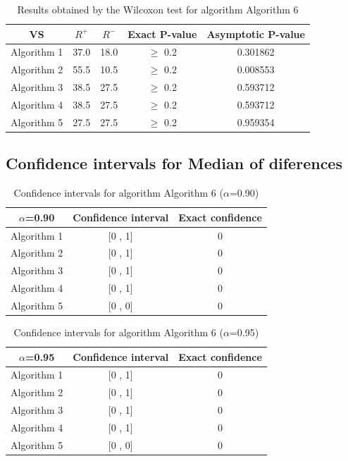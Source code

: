 \documentclass[a4paper,10pt]{article}
\begin{document}
\begin{table}[!htp]
\centering\small
\begin{tabular}{
|c|c|c|c|c|}
\hline
 VS & $R^{+}$ & $R^{-}$ & Exact P-value & Asymptotic P-value \\ \hline 
Algorithm 1 & 37.0 & 18.0 & $\geq$ 0.2 & 0.301862\\ \hline 
Algorithm 2 & 55.5 & 10.5 & $\geq$ 0.2 & 0.008553\\ \hline 
Algorithm 3 & 38.5 & 27.5 & $\geq$ 0.2 & 0.593712\\ \hline 
Algorithm 4 & 38.5 & 27.5 & $\geq$ 0.2 & 0.593712\\ \hline 
Algorithm 5 & 27.5 & 27.5 & $\geq$ 0.2 & 0.959354\\ \hline 

\end{tabular}
\caption{Results obtained by the Wilcoxon test for algorithm Algorithm 6}
\end{table}

\subsection{Confidence intervals for Median of diferences}

\begin{table}[!htp]
\centering\small
\begin{tabular}{
|c|c|c|}
\hline
 $\alpha$=0.90 & Confidence interval & Exact confidence \\ \hline 
Algorithm 1 & [0 , 1] & 0\\ \hline 
Algorithm 2 & [0 , 1] & 0\\ \hline 
Algorithm 3 & [0 , 1] & 0\\ \hline 
Algorithm 4 & [0 , 1] & 0\\ \hline 
Algorithm 5 & [0 , 0] & 0\\ \hline 

\end{tabular}
\caption{Confidence intervals for algorithm Algorithm 6 ($\alpha$=0.90)}
\end{table}
\begin{table}[!htp]
\centering\small
\begin{tabular}{
|c|c|c|}
\hline
 $\alpha$=0.95 & Confidence interval & Exact confidence \\ \hline 
Algorithm 1 & [0 , 1] & 0\\ \hline 
Algorithm 2 & [0 , 1] & 0\\ \hline 
Algorithm 3 & [0 , 1] & 0\\ \hline 
Algorithm 4 & [0 , 1] & 0\\ \hline 
Algorithm 5 & [0 , 0] & 0\\ \hline 

\end{tabular}
\caption{Confidence intervals for algorithm Algorithm 6 ($\alpha$=0.95)}
\end{table}

 \clearpage 
\end{document}
